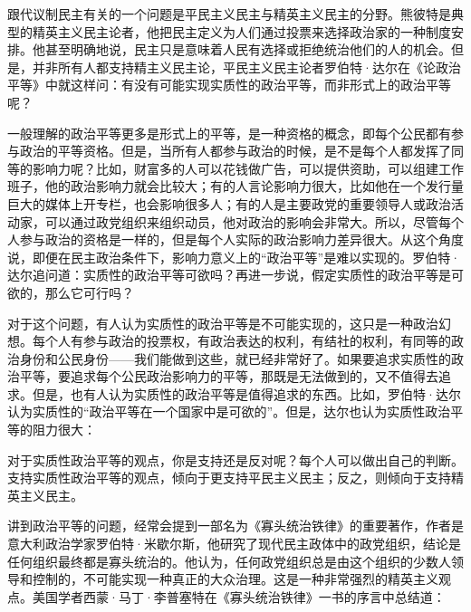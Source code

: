 跟代议制民主有关的一个问题是平民主义民主与精英主义民主的分野。熊彼特是典型的精英主义民主论者，他把民主定义为人们通过投票来选择政治家的一种制度安排。他甚至明确地说，民主只是意味着人民有选择或拒绝统治他们的人的机会。但是，并非所有人都支持精主义民主论，平民主义民主论者罗伯特·达尔在《论政治平等》中就这样问：有没有可能实现实质性的政治平等，而非形式上的政治平等呢？

一般理解的政治平等更多是形式上的平等，是一种资格的概念，即每个公民都有参与政治的平等资格。但是，当所有人都参与政治的时候，是不是每个人都发挥了同等的影响力呢？比如，财富多的人可以花钱做广告，可以提供资助，可以组建工作班子，他的政治影响力就会比较大；有的人言论影响力很大，比如他在一个发行量巨大的媒体上开专栏，也会影响很多人；有的人是主要政党的重要领导人或政治活动家，可以通过政党组织来组织动员，他对政治的影响会非常大。所以，尽管每个人参与政治的资格是一样的，但是每个人实际的政治影响力差异很大。从这个角度说，即便在民主政治条件下，影响力意义上的“政治平等”是难以实现的。罗伯特·达尔追问道：实质性的政治平等可欲吗？再进一步说，假定实质性的政治平等是可欲的，那么它可行吗？

对于这个问题，有人认为实质性的政治平等是不可能实现的，这只是一种政治幻想。每个人有参与政治的投票权，有政治表达的权利，有结社的权利，有同等的政治身份和公民身份——我们能做到这些，就已经非常好了。如果要追求实质性的政治平等，要追求每个公民政治影响力的平等，那既是无法做到的，又不值得去追求。但是，也有人认为实质性的政治平等是值得追求的东西。比如，罗伯特·达尔认为实质性的“政治平等在一个国家中是可欲的”。但是，达尔也认为实质性政治平等的阻力很大：


对于实质性政治平等的观点，你是支持还是反对呢？每个人可以做出自己的判断。支持实质性政治平等的观点，倾向于更支持平民主义民主；反之，则倾向于支持精英主义民主。

讲到政治平等的问题，经常会提到一部名为《寡头统治铁律》的重要著作，作者是意大利政治学家罗伯特·米歇尔斯，他研究了现代民主政体中的政党组织，结论是任何组织最终都是寡头统治的。他认为，任何政党组织总是由这个组织的少数人领导和控制的，不可能实现一种真正的大众治理。这是一种非常强烈的精英主义观点。美国学者西蒙·马丁·李普塞特在《寡头统治铁律》一书的序言中总结道：


